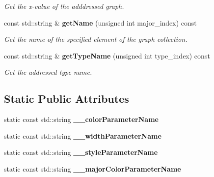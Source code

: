 \begin{DoxyCompactItemize}
\begin{DoxyCompactList}\small\item\em Get the x-\/value of the adddressed graph. \end{DoxyCompactList}\item 
const std\-::string \& {\bf get\-Name} (unsigned int major\-\_\-index) const 
\begin{DoxyCompactList}\small\item\em Get the name of the specified element of the graph collection. \end{DoxyCompactList}\item 
const std\-::string \& {\bf get\-Type\-Name} (unsigned int type\-\_\-index) const 
\begin{DoxyCompactList}\small\item\em Get the addressed type name. \end{DoxyCompactList}\end{DoxyCompactItemize}
\subsection*{Static Public Attributes}
\begin{DoxyCompactItemize}
\item 
static const std\-::string {\bfseries \-\_\-\-\_\-color\-Parameter\-Name}\label{classhistmgr_1_1GraphCollection__t_a1934a2578324612aa48e561e45058694}

\item 
static const std\-::string {\bfseries \-\_\-\-\_\-width\-Parameter\-Name}\label{classhistmgr_1_1GraphCollection__t_ac0f6932a278f313baffc9939f4cb06b3}

\item 
static const std\-::string {\bfseries \-\_\-\-\_\-style\-Parameter\-Name}\label{classhistmgr_1_1GraphCollection__t_acd025c2ba443992253384db6a7d17a8e}

\item 
static const std\-::string {\bfseries \-\_\-\-\_\-major\-Color\-Parameter\-Name}\label{classhistmgr_1_1GraphCollection__t_a8dfd0bff85a2211a1e7090aa43506c4d}

\end{DoxyCompactItemize}
